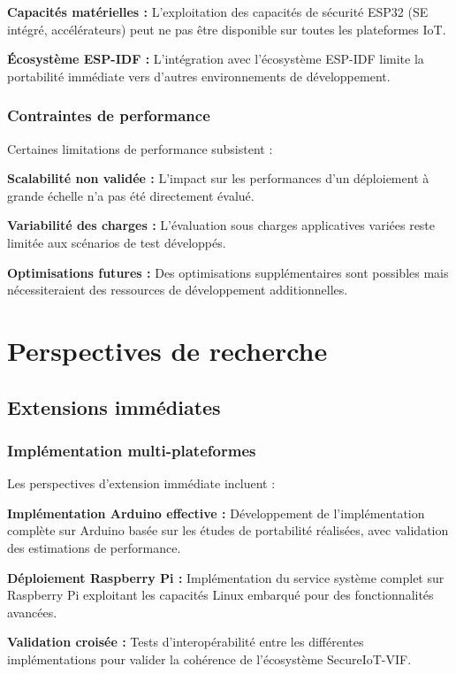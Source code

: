\textbf{Capacités matérielles :} L'exploitation des capacités de sécurité ESP32 (SE intégré, accélérateurs) peut ne pas être disponible sur toutes les plateformes IoT.

\textbf{Écosystème ESP-IDF :} L'intégration avec l'écosystème ESP-IDF limite la portabilité immédiate vers d'autres environnements de développement.

\subsubsection{Contraintes de performance}

Certaines limitations de performance subsistent :

\textbf{Scalabilité non validée :} L'impact sur les performances d'un déploiement à grande échelle n'a pas été directement évalué.

\textbf{Variabilité des charges :} L'évaluation sous charges applicatives variées reste limitée aux scénarios de test développés.

\textbf{Optimisations futures :} Des optimisations supplémentaires sont possibles mais nécessiteraient des ressources de développement additionnelles.

\section{Perspectives de recherche}

\subsection{Extensions immédiates}

\subsubsection{Implémentation multi-plateformes}

Les perspectives d'extension immédiate incluent :

\textbf{Implémentation Arduino effective :} Développement de l'implémentation complète sur Arduino basée sur les études de portabilité réalisées, avec validation des estimations de performance.

\textbf{Déploiement Raspberry Pi :} Implémentation du service système complet sur Raspberry Pi exploitant les capacités Linux embarqué pour des fonctionnalités avancées.

\textbf{Validation croisée :} Tests d'interopérabilité entre les différentes implémentations pour valider la cohérence de l'écosystème SecureIoT-VIF.

